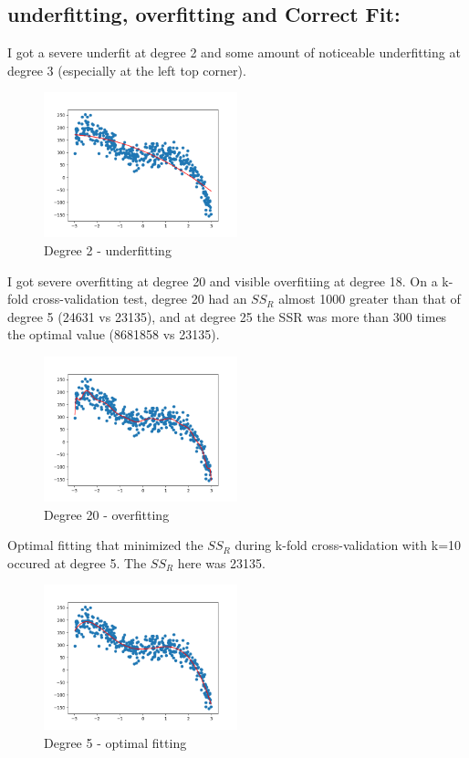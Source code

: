 \subsection{underfitting, overfitting and Correct Fit: }
I got a severe underfit at degree 2 and some amount of noticeable underfitting at degree 3 (especially at the left top corner).
\begin{figure}[H]
    \centering
    \includegraphics[width=0.5\textwidth]{../q3/degree_2.png}
    \caption{Degree 2 - underfitting}
    \label{fig:q3_1}
\end{figure}
I got severe overfitting at degree 20 and visible overfitiing at degree 18. On a k-fold cross-validation test, degree 20 had an $SS_R$ almost 1000 greater than that of degree 5 (24631 vs 23135), and at degree 25 the SSR was more than 300 times the optimal value (8681858 vs 23135).
\begin{figure}[H]
    \centering
    \includegraphics[width=0.5\textwidth]{../q3/degree_20.png}
    \caption{Degree 20 - overfitting}
    \label{fig:q3_2}
\end{figure}  
Optimal fitting that minimized the $SS_R$ during k-fold cross-validation with k=10 occured at degree 5. The $SS_R$ here was 23135.
\begin{figure}[H]
    \centering
    \includegraphics[width=0.5\textwidth]{../q3/degree_5.png}
    \caption{Degree 5 - optimal fitting}
    \label{fig:q3_3}
\end{figure}
\newpage 